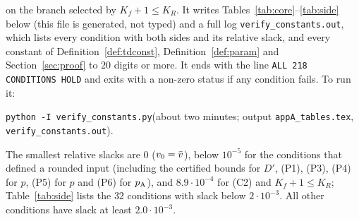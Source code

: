 on the branch selected by $K_f+1\le K_R$. It writes Tables~\ref{tab:core}--\ref{tab:side} below (this file is generated, not typed) and a
full log \texttt{verify\_constants.out}, which lists every condition with both sides and its relative slack, and every constant of
Definition~\ref{def:tdconst}, Definition~\ref{def:param} and Section~\ref{sec:proof} to $20$ digits or more. It ends with the line
\texttt{ALL 218 CONDITIONS HOLD} and exits with a non-zero status if any condition fails. To run it:
\begin{center}
\texttt{python -I verify\_constants.py}\qquad(about two minutes; output \texttt{appA\_tables.tex}, \texttt{verify\_constants.out}).
\end{center}
The smallest relative slacks are $0$ ($v_0=\bar v$), below $10^{-5}$ for the conditions that defined a rounded input (including the
certified bounds for $D'$, (P1), (P3), (P4) for $p$, (P5) for $p$ and (P6) for $p_{\mathrm A}$), and $8.9\cdot10^{-4}$ for (C2) and $K_f+1\le K_R$;
Table~\ref{tab:side} lists the $32$ conditions with slack below $2\cdot10^{-3}$. All other conditions have slack at least $2.0\cdot10^{-3}$.



